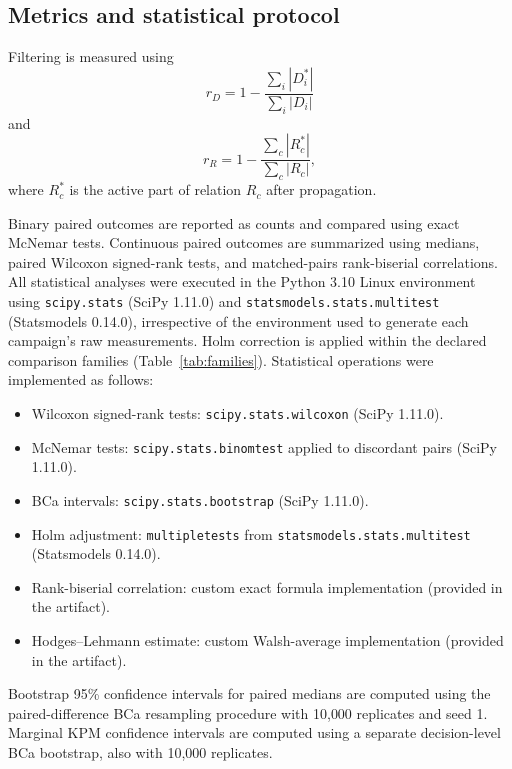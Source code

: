 \documentclass[pdflatex,sn-mathphys-num,iicol,oneside]{sn-jnl}
\begin{document}
\subsection{Metrics and statistical protocol}

Filtering is measured using
\begin{equation}
r_D
=
1-
\frac{\sum_i|D_i^{*}|}
     {\sum_i|D_i|}
\end{equation}
and
\begin{equation}
r_R
=
1-
\frac{\sum_c|R_c^{*}|}
     {\sum_c|R_c|},
\end{equation}
where $R_c^{*}$ is the active part of relation $R_c$ after
propagation.

Binary paired outcomes are reported as counts and compared using
exact McNemar tests. Continuous paired outcomes are summarized using
medians, paired Wilcoxon signed-rank tests, and matched-pairs
rank-biserial correlations. All statistical analyses were executed in the Python 3.10 Linux environment using \texttt{scipy.stats} (SciPy 1.11.0) and \texttt{statsmodels.stats.multitest} (Statsmodels 0.14.0), irrespective of the environment used to generate each campaign's raw measurements. Holm
correction is applied within the declared comparison families (Table~\ref{tab:families}).
Statistical operations were implemented as follows:
\begin{itemize}
\item Wilcoxon signed-rank tests: \texttt{scipy.stats.wilcoxon} (SciPy 1.11.0).
\item McNemar tests: \texttt{scipy.stats.binomtest} applied to discordant pairs (SciPy 1.11.0).
\item BCa intervals: \texttt{scipy.stats.bootstrap} (SciPy 1.11.0).
\item Holm adjustment: \texttt{multipletests} from \texttt{statsmodels.stats.multitest} (Statsmodels 0.14.0).
\item Rank-biserial correlation: custom exact formula implementation (provided in the artifact).
\item Hodges--Lehmann estimate: custom Walsh-average implementation (provided in the artifact).
\end{itemize}
Bootstrap 95\% confidence intervals for paired medians are computed using the paired-difference BCa resampling procedure with 10{,}000 replicates and seed 1. Marginal KPM confidence intervals are computed using a separate decision-level BCa bootstrap, also with 10{,}000 replicates.
\end{document}
